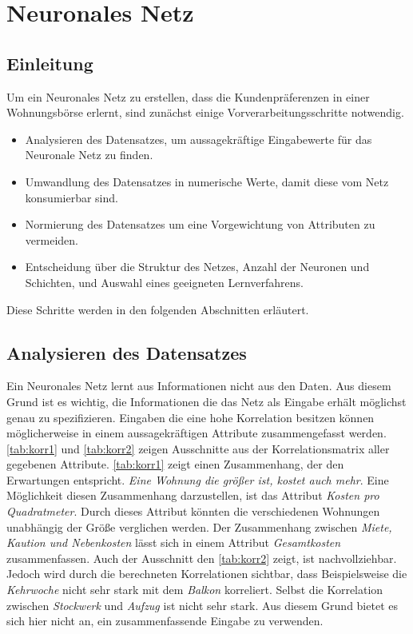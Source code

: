 \section{Neuronales Netz}\label{sec:kaptiel}
\subsection{Einleitung}
Um ein Neuronales Netz zu erstellen, dass die Kundenpräferenzen in einer Wohnungsbörse erlernt,
sind zunächst einige Vorverarbeitungsschritte notwendig.
\begin{itemize}
    \item Analysieren des Datensatzes, um aussagekräftige Eingabewerte für das Neuronale Netz zu
            finden.
    \item Umwandlung des Datensatzes in numerische Werte, damit diese vom Netz konsumierbar sind.
    \item Normierung des Datensatzes um eine Vorgewichtung von Attributen zu vermeiden.
    \item Entscheidung über die Struktur des Netzes, Anzahl der Neuronen und Schichten, und Auswahl
            eines geeigneten Lernverfahrens.
\end{itemize}
Diese Schritte werden in den folgenden Abschnitten erläutert.

\subsection{Analysieren des Datensatzes}
Ein Neuronales Netz lernt aus Informationen nicht aus den Daten. Aus diesem Grund ist es wichtig,
die Informationen die das Netz als Eingabe erhält möglichst genau zu spezifizieren. Eingaben die
eine hohe Korrelation besitzen können möglicherweise in einem aussagekräftigen Attribute
zusammengefasst werden.
\autoref{tab:korr1} und \autoref{tab:korr2} zeigen Ausschnitte aus der Korrelationsmatrix aller
gegebenen Attribute.
\autoref{tab:korr1} zeigt einen Zusammenhang, der den Erwartungen entspricht. \textit{Eine Wohnung die größer ist, kostet auch mehr}.
Eine Möglichkeit diesen Zusammenhang darzustellen, ist das Attribut \textit{Kosten pro Quadratmeter}. Durch dieses Attribut
könnten die verschiedenen Wohnungen unabhängig der Größe verglichen werden. Der Zusammenhang zwischen \textit{Miete, Kaution und Nebenkosten}
lässt sich in einem Attribut \textit{Gesamtkosten} zusammenfassen.
Auch der Ausschnitt den \autoref{tab:korr2} zeigt, ist nachvollziehbar. Jedoch wird durch die berechneten Korrelationen sichtbar,
dass Beispielsweise die \textit{Kehrwoche} nicht sehr stark mit dem \textit{Balkon} korreliert. Selbst die Korrelation zwischen
\textit{Stockwerk} und \textit{Aufzug} ist nicht sehr stark. Aus diesem Grund bietet es sich hier nicht an, ein zusammenfassende
Eingabe zu verwenden.

